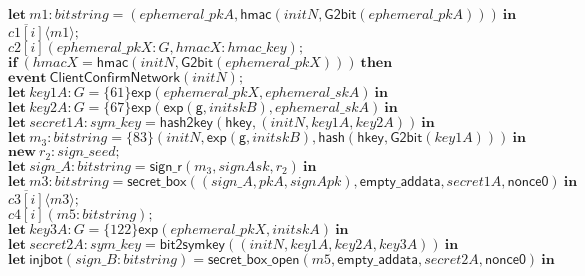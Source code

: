 \documentclass{article}
\newcommand{\cinput}[2]{{#1}({#2})}
\newcommand{\coutput}[2]{\overline{#1}\langle{#2}\rangle}
\newcommand{\kw}[1]{\mathbf{#1}}
\newcommand{\kwf}[1]{\mathsf{#1}}
\newcommand{\var}[1]{\mathit{#1}}
\newcommand{\kwt}[1]{\mathit{#1}}
\newcommand{\kwc}[1]{\mathit{#1}}
\begin{document}
\begin{tabbing}
\>$\quad \kw{let}\ \var{m1}: \kwt{bitstring} = \kwf{}(\var{ephemeral{\_}pkA}, \kwf{hmac}(\var{initN}, \kwf{G2bit}(\var{ephemeral{\_}pkA})))\ \kw{in}$\\
\>$\quad \coutput{\kwc{c1}[\var{i}]}{\var{m1}};$\\
\>$\quad \cinput{\kwc{c2}[\var{i}]}{\var{ephemeral{\_}pkX}: \kwt{G}, \var{hmacX}: \kwt{hmac{\_}key}};$\\
\>$\quad \kw{if}\ (\var{hmacX}  =  \kwf{hmac}(\var{initN}, \kwf{G2bit}(\var{ephemeral{\_}pkX})))\ \kw{then}$\\
\>$\quad \kw{event}\ \kwf{ClientConfirmNetwork}(\var{initN});$\\
\>$\quad \kw{let}\ \var{key1A}: \kwt{G} = \{61\}\kwf{exp}(\var{ephemeral{\_}pkX}, \var{ephemeral{\_}skA})\ \kw{in}$\\
\>$\quad \kw{let}\ \var{key2A}: \kwt{G} = \{67\}\kwf{exp}(\kwf{exp}(\kwf{g}, \var{initskB}), \var{ephemeral{\_}skA})\ \kw{in}$\\
\>$\quad \kw{let}\ \var{secret1A}: \kwt{sym{\_}key} = \kwf{hash2key}(\kwf{hkey}, \kwf{}(\var{initN}, \var{key1A}, \var{key2A}))\ \kw{in}$\\
\>$\quad \kw{let}\ \var{m}_{3}: \kwt{bitstring} = \{83\}\kwf{}(\var{initN}, \kwf{exp}(\kwf{g}, \var{initskB}), \kwf{hash}(\kwf{hkey}, \kwf{G2bit}(\var{key1A})))\ \kw{in}$\\
\>$\quad \kw{new}\ \var{r}_{2}: \kwt{sign{\_}seed};$\\
\>$\quad \kw{let}\ \var{sign{\_}A}: \kwt{bitstring} = \kwf{sign{\_}r}(\var{m}_{3}, \var{signAsk}, \var{r}_{2})\ \kw{in}$\\
\>$\quad \kw{let}\ \var{m3}: \kwt{bitstring} = \kwf{secret{\_}box}(\kwf{}(\var{sign{\_}A}, \var{pkA}, \var{signApk}), \kwf{empty{\_}addata}, \var{secret1A}, \kwf{nonce0})\ \kw{in}$\\
\>$\quad \coutput{\kwc{c3}[\var{i}]}{\var{m3}};$\\
\>$\quad \cinput{\kwc{c4}[\var{i}]}{\var{m5}: \kwt{bitstring}};$\\
\>$\quad \kw{let}\ \var{key3A}: \kwt{G} = \{122\}\kwf{exp}(\var{ephemeral{\_}pkX}, \var{initskA})\ \kw{in}$\\
\>$\quad \kw{let}\ \var{secret2A}: \kwt{sym{\_}key} = \kwf{bit2symkey}(\kwf{}(\var{initN}, \var{key1A}, \var{key2A}, \var{key3A}))\ \kw{in}$\\
\>$\quad \kw{let}\ \kwf{injbot}(\var{sign{\_}B}: \kwt{bitstring}) = \kwf{secret{\_}box{\_}open}(\var{m5}, \kwf{empty{\_}addata}, \var{secret2A}, \kwf{nonce0})\ \kw{in}$\\

\end{tabbing}
\end{document}
